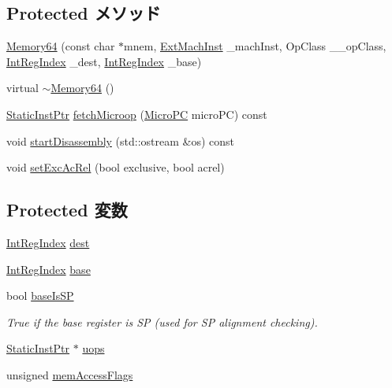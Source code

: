\subsection*{Protected メソッド}
\begin{DoxyCompactItemize}
\item 
\hyperlink{classArmISA_1_1Memory64_aac84f94b08d6107cba99c3dc98e0de10}{Memory64} (const char $\ast$mnem, \hyperlink{classStaticInst_a5605d4fc727eae9e595325c90c0ec108}{ExtMachInst} \_\-machInst, OpClass \_\-\_\-opClass, \hyperlink{namespaceArmISA_ae64680ba9fb526106829d6bf92fc791b}{IntRegIndex} \_\-dest, \hyperlink{namespaceArmISA_ae64680ba9fb526106829d6bf92fc791b}{IntRegIndex} \_\-base)
\item 
virtual \hyperlink{classArmISA_1_1Memory64_a534c7547153e4e2a6f67c273d5b67c47}{$\sim$Memory64} ()
\item 
\hyperlink{classRefCountingPtr}{StaticInstPtr} \hyperlink{classArmISA_1_1Memory64_ae9e7acd6304ee397f1ab470e283ae76b}{fetchMicroop} (\hyperlink{base_2types_8hh_adfb4d8b20c5abc8be73dd367b16f2d57}{MicroPC} microPC) const 
\item 
void \hyperlink{classArmISA_1_1Memory64_aceb6ce0f36dfd65e30eb9ba0b36ed543}{startDisassembly} (std::ostream \&os) const 
\item 
void \hyperlink{classArmISA_1_1Memory64_a991fca7089593d982952f72e58aa291f}{setExcAcRel} (bool exclusive, bool acrel)
\end{DoxyCompactItemize}
\subsection*{Protected 変数}
\begin{DoxyCompactItemize}
\item 
\hyperlink{namespaceArmISA_ae64680ba9fb526106829d6bf92fc791b}{IntRegIndex} \hyperlink{classArmISA_1_1Memory64_aec72e8e45bdc87abeeeb75d2a8a9a716}{dest}
\item 
\hyperlink{namespaceArmISA_ae64680ba9fb526106829d6bf92fc791b}{IntRegIndex} \hyperlink{classArmISA_1_1Memory64_ad7a926fdfe0820284d654e9139a423b2}{base}
\item 
bool \hyperlink{classArmISA_1_1Memory64_a3993b505387debb1b0d8c46006c99ab0}{baseIsSP}
\begin{DoxyCompactList}\small\item\em True if the base register is SP (used for SP alignment checking). \item\end{DoxyCompactList}\item 
\hyperlink{classRefCountingPtr}{StaticInstPtr} $\ast$ \hyperlink{classArmISA_1_1Memory64_a4b95b3465f3133312f95fdaf25b90b36}{uops}
\item 
unsigned \hyperlink{classArmISA_1_1Memory64_a827c936c9e2b1f1cf21a01f204a8d821}{memAccessFlags}
\end{DoxyCompactItemize}
